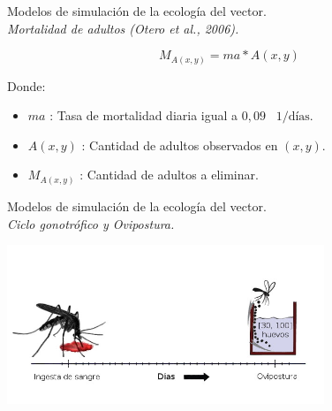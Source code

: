 {
\begin{frame}[c]{Modelos de simulación de la ecología del vector.\\\textit{Mortalidad de adultos (Otero et al., 2006).}}
  \begin{center}
    \begin{equation}
        M_{A(x,y)} = ma * A(x,y)
    \end{equation}
  \end{center}
  Donde:
    \begin{itemize}
      \item $ma$ : Tasa de mortalidad diaria igual a $0,09$ \ $1/\text{días}$.
      \item $A(x, y)$ : Cantidad de adultos observados en $(x,y)$.
      \item $M_{A(x,y)}$ : Cantidad de adultos a eliminar.
    \end{itemize}
\end{frame}
}

\begin{frame}[c]{Modelos de simulación de la ecología del vector.\\\textit{Ciclo gonotrófico y Ovipostura.}}
  \begin{center}
      \includegraphics[width=9.5cm]{./graphics/cliclo-gonotrofico-tiempo.jpg}
  \end{center}
\end{frame}

